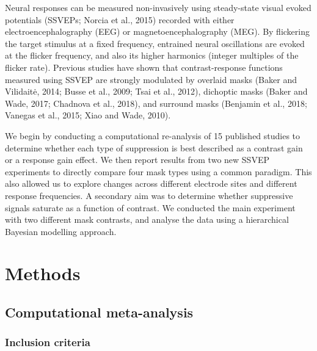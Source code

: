 \documentclass[]{article}
\begin{document}
Neural responses can be measured non-invasively using steady-state visual evoked potentials (SSVEPs; Norcia et al., 2015) recorded with either electroencephalography (EEG) or magnetoencephalography (MEG). By flickering the target stimulus at a fixed frequency, entrained neural oscillations are evoked at the flicker frequency, and also its higher harmonics (integer multiples of the flicker rate). Previous studies have shown that contrast-response functions measured using SSVEP are strongly modulated by overlaid masks (Baker and Vilidaitė, 2014; Busse et al., 2009; Tsai et al., 2012), dichoptic masks (Baker and Wade, 2017; Chadnova et al., 2018), and surround masks (Benjamin et al., 2018; Vanegas et al., 2015; Xiao and Wade, 2010).

We begin by conducting a computational re-analysis of 15 published studies to determine whether each type of suppression is best described as a contrast gain or a response gain effect. We then report results from two new SSVEP experiments to directly compare four mask types using a common paradigm. This also allowed us to explore changes across different electrode sites and different response frequencies. A secondary aim was to determine whether suppressive signals saturate as a function of contrast. We conducted the main experiment with two different mask contrasts, and analyse the data using a hierarchical Bayesian modelling approach.

\hypertarget{methods}{%
\section{Methods}\label{methods}}

\hypertarget{computational-meta-analysis}{%
\subsection{Computational meta-analysis}\label{computational-meta-analysis}}

\hypertarget{inclusion-criteria}{%
\subsubsection{Inclusion criteria}\label{inclusion-criteria}}
\end{document}
